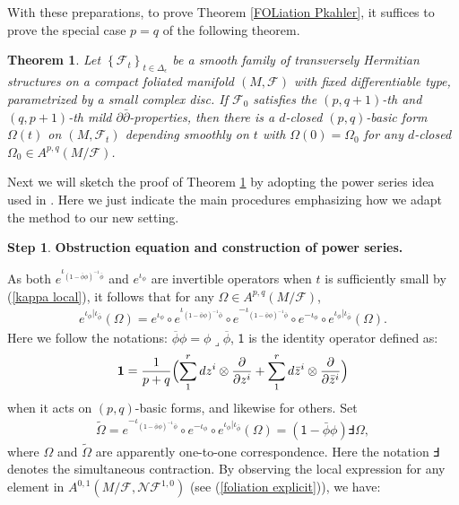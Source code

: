 \documentclass[12pt]{amsart}
\numberwithin{equation}{section}
\newtheorem{theorem} {Theorem} [section]
\theoremstyle{definition}
\newtheorem{step}{Step}
\theoremstyle{definition}
\theoremstyle{definition}
\renewcommand{\1}{\mathsf{1}}
\newcommand{\lc}{\lrcorner}
\renewcommand{\>}{\rightarrow}
\newcommand{\p}{\partial}
\def\p{\partial}
\def\b{\bar}
\def\mc{\mathcal}
\theoremstyle{plain} %
\theoremstyle{plain} %
\theoremstyle{plain} %
\begin{document}
	With these preparations, to prove Theorem \ref{FOLiation Pkahler}, it suffices to prove the special case $p=q$ of the following theorem.
	\begin{theorem}\label{FOliation Mild}
		Let $\left\{\mc F_t\right\}_{t\in \Delta_{\epsilon}}$ be a smooth family of transversely Hermitian structures on a compact  foliated manifold $(M,\mc F)$ with fixed differentiable type, parametrized by a small complex disc. If   $\mathcal{F}_{0}$  satisfies the $(p,q+1)$-th and $(q,p+1)$-th mild $\p\b{\p}$-properties, then there is a $d$-closed $(p,q)$-basic form $\Omega(t)$ on $(M,\mc F_t)$ depending smoothly on $t$ with $\Omega(0)=\Omega_0$ for any  $d$-closed $\Omega_0\in A^{p,q}(M/\mc F)$.
	\end{theorem}
	
	
	Next we will sketch the proof of Theorem \ref{FOliation Mild} by adopting the power series idea used in \cite[Section 4]{RWZ19}. Here we just indicate the main procedures emphasizing how we adapt the method to our new setting.
	
	\begin{step}\label{foliation step 3}
		{\rm\textbf{Obstruction equation and construction of power series.}}\end{step}
	
	As both $e^{ {\iota}_{(\1-\b{ \phi} \phi)^{-1}\b{ \phi}}}$ and
	$e^{ {\iota}_{ \phi}}$ are invertible operators when $t$ is
	sufficiently small by (\ref{kappa local}), it follows that for any $\Omega \in
	A^{p,q}(M/\mc F)$,
	\begin{align}\label{2.1.1}
		e^{ {\iota}_{ \phi}| {\iota}_{\b{ \phi}}}(\Omega)=e^{ {\iota}_{ \phi}}\circ e^{ {\iota}_{(\1-\b{ \phi} \phi)^{-1}\b{ \phi}}}\circ e^{- {\iota}_{(\1-\b{ \phi} \phi)^{-1}\b{ \phi}}}\circ e^{- {\iota}_{ \phi}}\circ e^{ {\iota}_{ \phi}| {\iota}_{\b{ \phi}}}(\Omega).
	\end{align}
	Here we follow the notations:
	$\overline{ \phi}  \phi =  \phi \lc \overline{ \phi}$, $\1$ is the identity operator defined as:
	\[
	\mathbf{1} = \frac{1}{p+q} \Bigl( \sum_1^r dz^i \otimes \frac{\partial}{\partial z^i} + \sum_1^r d\bar{z}^i \otimes \frac{\partial}{\partial \bar{z}^i} \Bigr)
	\]
	when it acts on $(p,q)$-basic forms, and likewise for others.
	Set
	\begin{align}\label{2.1.2}
		\widetilde{\Omega}=e^{- {\iota}_{(\1-\b{ \phi} \phi)^{-1}\b{ \phi}}}\circ e^{- {\iota}_{ \phi}}\circ e^{ {\iota}_{ \phi}| {\iota}_{\b{ \phi}}}(\Omega)=(\1-\b{ \phi} \phi)\Finv\Omega,
	\end{align}
	where $\Omega$ and $\widetilde{\Omega}$ are apparently one-to-one
	correspondence. Here the notation $\Finv$  denotes the
	simultaneous contraction. By observing  the local expression  for any element in $ A^{0,1}(M/\mc F,\mc N\mc F^{1,0})$ (see (\ref{foliation explicit})), we have:
	
\end{document}
